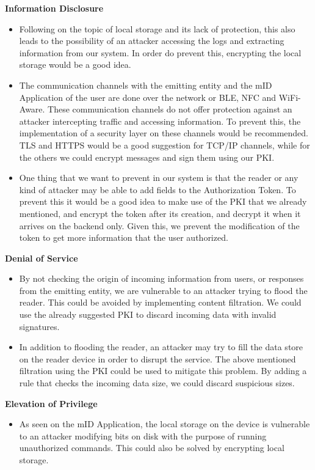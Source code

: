 \textbf{Information Disclosure}
\begin{itemize}
    \item Following on the topic of local storage and its lack of protection, this also leads to the possibility of an attacker accessing the logs and extracting information from our system. In order do prevent this, encrypting the local storage would be a good idea.
    \item The communication channels with the emitting entity and the mID Application of the user are done over the network or BLE, NFC and WiFi-Aware. These communication channels do not offer protection against an attacker intercepting traffic and accessing information. To prevent this, the implementation of a security layer on these channels would be recommended. TLS\cite{tls} and HTTPS would be a good suggestion for TCP/IP channels, while for the others we could encrypt messages and sign them using our PKI\cite{pki}.
    \item One thing that we want to prevent in our system is that the reader or any kind of attacker may be able to add fields to the Authorization Token. To prevent this it would be a good idea to make use of the PKI\cite{pki} that we already mentioned, and encrypt the token after its creation, and decrypt it when it arrives on the backend only. Given this, we prevent the modification of the token to get more information that the user authorized.
\end{itemize}

\textbf{Denial of Service}
\begin{itemize}
    \item By not checking the origin of incoming information from users, or responses from the emitting entity, we are vulnerable to an attacker trying to flood the reader. This could be avoided by implementing content filtration. We could use the already suggested PKI\cite{pki} to discard incoming data with invalid signatures.
    \item In addition to flooding the reader, an attacker may try to fill the data store on the reader device in order to disrupt the service. The above mentioned filtration using the PKI\cite{pki} could be used to mitigate this problem. By adding a rule that checks the incoming data size, we could discard suspicious sizes.
\end{itemize}


\newpage

\textbf{Elevation of Privilege}
\begin{itemize}
    \item As seen on the mID Application, the local storage on the device is vulnerable to an attacker modifying bits on disk with the purpose of running unauthorized commands. This could also be solved by encrypting local storage.
\end{itemize}


